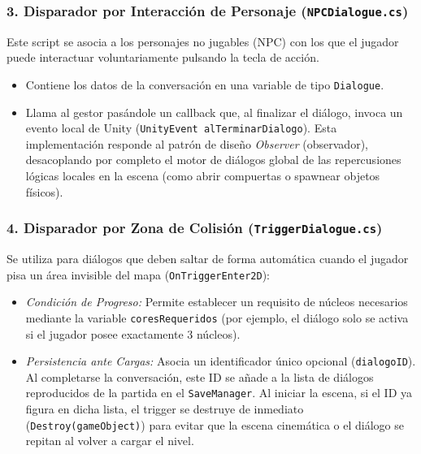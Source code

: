 \subsubsection{3. Disparador por Interacción de Personaje (\texttt{NPCDialogue.cs})}
Este script se asocia a los personajes no jugables (NPC) con los que el jugador puede interactuar voluntariamente pulsando la tecla de acción. 
\begin{itemize}
    \item Contiene los datos de la conversación en una variable de tipo \texttt{Dialogue}.
    \item Llama al gestor pasándole un callback que, al finalizar el diálogo, invoca un evento local de Unity (\texttt{UnityEvent alTerminarDialogo}). Esta implementación responde al patrón de diseño \textit{Observer} (observador), desacoplando por completo el motor de diálogos global de las repercusiones lógicas locales en la escena (como abrir compuertas o spawnear objetos físicos).
\end{itemize}

\subsubsection{4. Disparador por Zona de Colisión (\texttt{TriggerDialogue.cs})}
Se utiliza para diálogos que deben saltar de forma automática cuando el jugador pisa un área invisible del mapa (\texttt{OnTriggerEnter2D}):
\begin{itemize}
    \item \textit{Condición de Progreso:} Permite establecer un requisito de núcleos necesarios mediante la variable \texttt{coresRequeridos} (por ejemplo, el diálogo solo se activa si el jugador posee exactamente 3 núcleos).
    \item \textit{Persistencia ante Cargas:} Asocia un identificador único opcional (\texttt{dialogoID}). Al completarse la conversación, este ID se añade a la lista de diálogos reproducidos de la partida en el \texttt{SaveManager}. Al iniciar la escena, si el ID ya figura en dicha lista, el trigger se destruye de inmediato (\texttt{Destroy(gameObject)}) para evitar que la escena cinemática o el diálogo se repitan al volver a cargar el nivel.
\end{itemize}

